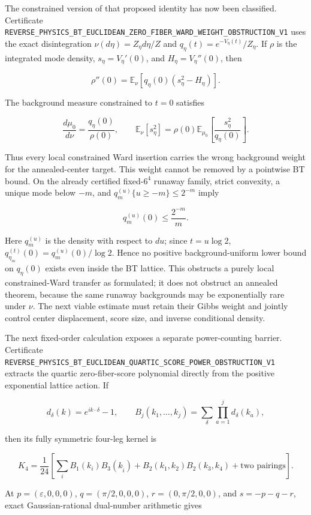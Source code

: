 \documentclass[11pt]{article}
\theoremstyle{definition}
\theoremstyle{remark}
\newcommand{\cert}[1]{\nolinkurl{#1}}
\begin{document}
The constrained version of that proposed identity has now been classified.
Certificate
\cert{REVERSE_PHYSICS_BT_EUCLIDEAN_ZERO_FIBER_WARD_WEIGHT_OBSTRUCTION_V1}
uses the exact disintegration
$\nu(d\eta)=Z_\eta d\eta/Z$ and
$q_\eta(t)=e^{-V_\eta(t)}/Z_\eta$.  If $\rho$ is the integrated mode density,
$s_\eta=V_\eta'(0)$, and $H_\eta=V_\eta''(0)$, then

\[
 \rho''(0)=
 \mathbb E_\nu[q_\eta(0)(s_\eta^2-H_\eta)].
\]

The background measure constrained to $t=0$ satisfies

\[
 \frac{d\mu_0}{d\nu}=\frac{q_\eta(0)}{\rho(0)},
 \qquad
 \mathbb E_\nu[s_\eta^2]
 =\rho(0)\mathbb E_{\mu_0}
   \left[\frac{s_\eta^2}{q_\eta(0)}\right].
\]

Thus every local constrained Ward insertion carries the wrong background
weight for the annealed-center target.  This weight cannot be removed by a
pointwise BT bound.  On the already certified fixed-$6^4$ runaway family,
strict convexity, a unique mode below $-m$, and
$q_m^{(u)}\{u\geq-m\}\leq2^{-m}$ imply

\[
                    q_m^{(u)}(0)\leq\frac{2^{-m}}m.
\]

Here $q_m^{(u)}$ is the density with respect to $du$; since $t=u\log2$,
$q_{\eta_m}^{(t)}(0)=q_m^{(u)}(0)/\log2$.  Hence no positive
background-uniform lower bound on $q_\eta(0)$ exists even
inside the BT lattice.  This obstructs a purely local constrained-Ward
transfer as formulated; it does not obstruct an annealed theorem, because
the same runaway backgrounds may be exponentially rare under $\nu$.  The
next viable estimate must retain their Gibbs weight and jointly control
center displacement, score size, and inverse conditional density.

The next fixed-order calculation exposes a separate power-counting barrier.
Certificate
\cert{REVERSE_PHYSICS_BT_EUCLIDEAN_QUARTIC_SCORE_POWER_OBSTRUCTION_V1}
extracts the quartic zero-fiber-score polynomial directly from the positive
exponential lattice action.  If

\[
 d_\delta(k)=e^{ik\cdot\delta}-1,
 \qquad
 B_j(k_1,\ldots,k_j)=\sum_\delta\prod_{a=1}^j d_\delta(k_a),
\]

then its fully symmetric four-leg kernel is

\[
 K_4=\frac1{24}\left[
 \sum_i B_1(k_i)B_3(k_{\widehat i})
 +B_2(k_1,k_2)B_2(k_3,k_4)+\text{two pairings}\right].
\]

At
$p=(\varepsilon,0,0,0)$,
$q=(\pi/2,0,0,0)$,
$r=(0,\pi/2,0,0)$, and $s=-p-q-r$, exact Gaussian-rational
dual-number arithmetic gives
\end{document}
